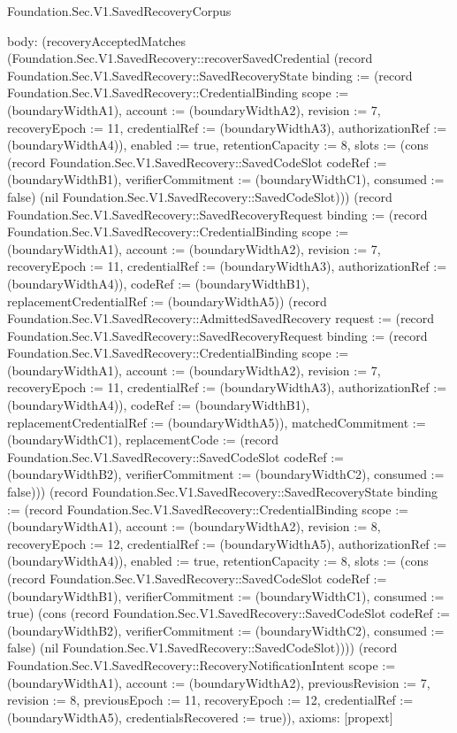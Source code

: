 \begin{lexlean}{Foundation.Sec.V1.SavedRecoveryCorpus}
\begin{semanticmodule}
{  body: (recoveryAcceptedMatches (Foundation.Sec.V1.SavedRecovery::recoverSavedCredential (record Foundation.Sec.V1.SavedRecovery::SavedRecoveryState {binding := (record Foundation.Sec.V1.SavedRecovery::CredentialBinding {scope := (boundaryWidthA1), account := (boundaryWidthA2), revision := 7, recoveryEpoch := 11, credentialRef := (boundaryWidthA3), authorizationRef := (boundaryWidthA4)}), enabled := true, retentionCapacity := 8, slots := (cons (record Foundation.Sec.V1.SavedRecovery::SavedCodeSlot {codeRef := (boundaryWidthB1), verifierCommitment := (boundaryWidthC1), consumed := false}) (nil Foundation.Sec.V1.SavedRecovery::SavedCodeSlot))}) (record Foundation.Sec.V1.SavedRecovery::SavedRecoveryRequest {binding := (record Foundation.Sec.V1.SavedRecovery::CredentialBinding {scope := (boundaryWidthA1), account := (boundaryWidthA2), revision := 7, recoveryEpoch := 11, credentialRef := (boundaryWidthA3), authorizationRef := (boundaryWidthA4)}), codeRef := (boundaryWidthB1), replacementCredentialRef := (boundaryWidthA5)}) (record Foundation.Sec.V1.SavedRecovery::AdmittedSavedRecovery {request := (record Foundation.Sec.V1.SavedRecovery::SavedRecoveryRequest {binding := (record Foundation.Sec.V1.SavedRecovery::CredentialBinding {scope := (boundaryWidthA1), account := (boundaryWidthA2), revision := 7, recoveryEpoch := 11, credentialRef := (boundaryWidthA3), authorizationRef := (boundaryWidthA4)}), codeRef := (boundaryWidthB1), replacementCredentialRef := (boundaryWidthA5)}), matchedCommitment := (boundaryWidthC1), replacementCode := (record Foundation.Sec.V1.SavedRecovery::SavedCodeSlot {codeRef := (boundaryWidthB2), verifierCommitment := (boundaryWidthC2), consumed := false})})) (record Foundation.Sec.V1.SavedRecovery::SavedRecoveryState {binding := (record Foundation.Sec.V1.SavedRecovery::CredentialBinding {scope := (boundaryWidthA1), account := (boundaryWidthA2), revision := 8, recoveryEpoch := 12, credentialRef := (boundaryWidthA5), authorizationRef := (boundaryWidthA4)}), enabled := true, retentionCapacity := 8, slots := (cons (record Foundation.Sec.V1.SavedRecovery::SavedCodeSlot {codeRef := (boundaryWidthB1), verifierCommitment := (boundaryWidthC1), consumed := true}) (cons (record Foundation.Sec.V1.SavedRecovery::SavedCodeSlot {codeRef := (boundaryWidthB2), verifierCommitment := (boundaryWidthC2), consumed := false}) (nil Foundation.Sec.V1.SavedRecovery::SavedCodeSlot)))}) (record Foundation.Sec.V1.SavedRecovery::RecoveryNotificationIntent {scope := (boundaryWidthA1), account := (boundaryWidthA2), previousRevision := 7, revision := 8, previousEpoch := 11, recoveryEpoch := 12, credentialRef := (boundaryWidthA5), credentialsRecovered := true})),
  axioms: [propext]
}


\end{semanticmodule}
\end{lexlean}
